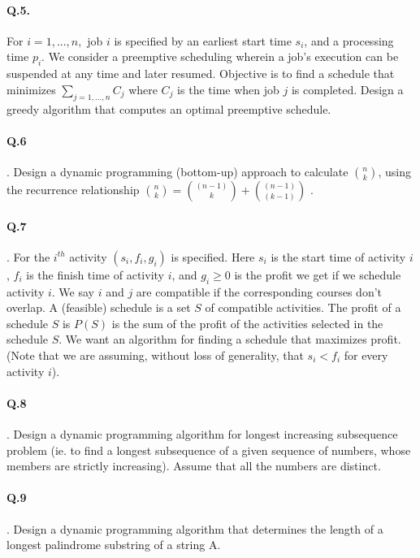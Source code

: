 \documentclass[a4paper,10pt]{article}
\begin{document}
\paragraph{Q.5.} For $i=1,...,n,$ job $i$ is specified by an earliest start time
$s_i$, and a processing time $p_i$.
We consider a preemptive scheduling wherein
a job's execution can be suspended at any time and later resumed.
Objective is to find a schedule that minimizes
$\sum_{j=1,...,n} C_j$ where $C_j$ is the time
when job $j$ is completed.
Design a greedy algorithm that computes an optimal preemptive schedule.

\paragraph{Q.6}. Design a dynamic programming (bottom-up) approach to calculate
${n \choose k}$, using the recurrence relationship ${n \choose k} = {(n-1)
\choose k} + {(n-1) \choose (k-1)}$ .

\paragraph{Q.7}. For the $i^{th}$ activity $(s_i, f_i, g_i)$ is specified.
Here $s_i$ is the start time of activity $i$, $f_i$ is the finish time of
activity $i$,
and $g_i \geq 0$ is the profit we get if we schedule activity $i$.
We say $i$ and $j$ are compatible if the corresponding courses don't overlap.
A (feasible) schedule is a set $S$ of compatible activities.
The profit of a schedule $S$ is $P(S)$ is the sum of the profit of the
activities selected in the schedule $S$.
We want an algorithm for finding a schedule that maximizes profit. (Note that we
are assuming, without loss of generality, that $s_i < f_i$ for every activity
$i$).

\paragraph{Q.8}. Design a dynamic programming algorithm for longest increasing
subsequence problem
(ie. to find a longest subsequence of a given sequence of numbers, whose members
are strictly increasing). Assume that all the numbers are distinct.

\paragraph{Q.9}. Design a dynamic programming algorithm that determines the
length of a longest palindrome substring of a string A.
\end{document}
